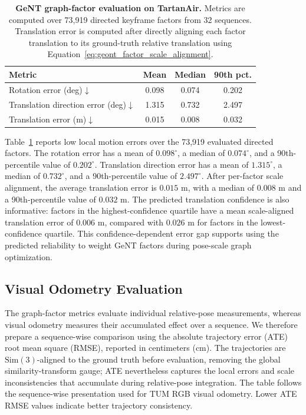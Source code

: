 \begin{table}[!t]
    \centering
    \caption{\textbf{GeNT graph-factor evaluation on TartanAir.}
    Metrics are computed over 73,919 directed keyframe factors from 32 sequences.
    Translation error is computed after directly aligning each factor translation to its ground-truth relative translation using Equation~\ref{eq:geont_factor_scale_alignment}.}
    \label{tab:geont_factor_eval}
    \small
    \setlength{\tabcolsep}{6pt}
    \renewcommand{\arraystretch}{1.12}
    \begin{tabular*}{\textwidth}{@{\extracolsep{\fill}}lccc@{}}
        \toprule
        \textbf{Metric} & \textbf{Mean} & \textbf{Median} & \textbf{90th pct.} \\
        \midrule
        Rotation error (deg)$\downarrow$ & 0.098 & 0.074 & 0.202 \\
        Translation direction error (deg)$\downarrow$ & 1.315 & 0.732 & 2.497 \\
        Translation error (m)$\downarrow$ & 0.015 & 0.008 & 0.032 \\
        \bottomrule
    \end{tabular*}
\end{table}

Table~\ref{tab:geont_factor_eval} reports low local motion errors over the 73,919 evaluated directed factors.
The rotation error has a mean of $0.098^{\circ}$, a median of $0.074^{\circ}$, and a 90th-percentile value of $0.202^{\circ}$.
Translation direction error has a mean of $1.315^{\circ}$, a median of $0.732^{\circ}$, and a 90th-percentile value of $2.497^{\circ}$.
After per-factor scale alignment, the average translation error is $0.015$ m, with a median of $0.008$ m and a 90th-percentile value of $0.032$ m.
The predicted translation confidence is also informative: factors in the highest-confidence quartile have a mean scale-aligned translation error of $0.006$ m, compared with $0.026$ m for factors in the lowest-confidence quartile.
This confidence-dependent error gap supports using the predicted reliability to weight GeNT factors during pose-scale graph optimization.

\subsection{Visual Odometry Evaluation}
The graph-factor metrics evaluate individual relative-pose measurements, whereas visual odometry measures their accumulated effect over a sequence.
We therefore prepare a sequence-wise comparison using the absolute trajectory error (ATE) root mean square (RMSE), reported in centimeters (cm).
The trajectories are $\mathrm{Sim}(3)$-aligned to the ground truth before evaluation, removing the global similarity-transform gauge; ATE nevertheless captures the local errors and scale inconsistencies that accumulate during relative-pose integration.
The table follows the sequence-wise presentation used for TUM RGB visual odometry.
Lower ATE RMSE values indicate better trajectory consistency.

